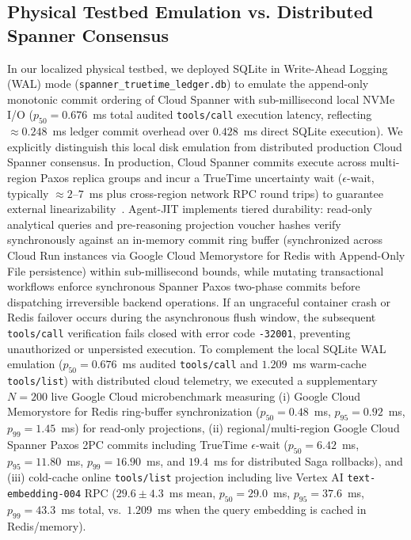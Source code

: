 \documentclass[conference,10pt]{IEEEtran}
\begin{document}
\subsection{Physical Testbed Emulation vs. Distributed Spanner Consensus}
In our localized physical testbed, we deployed SQLite in Write-Ahead Logging (WAL) mode (\texttt{spanner\_truetime\_ledger.db}) to emulate the append-only monotonic commit ordering of Cloud Spanner with sub-millisecond local NVMe I/O ($p_{50} = 0.676$~ms total audited \texttt{tools/call} execution latency, reflecting $\approx 0.248$~ms ledger commit overhead over $0.428$~ms direct SQLite execution). We explicitly distinguish this local disk emulation from distributed production Cloud Spanner consensus. In production, Cloud Spanner commits execute across multi-region Paxos replica groups and incur a TrueTime uncertainty wait ($\epsilon$-wait, typically $\approx 2$--$7$~ms plus cross-region network RPC round trips) to guarantee external linearizability~\cite{corbett2013spanner}. Agent-JIT implements tiered durability: read-only analytical queries and pre-reasoning projection voucher hashes verify synchronously against an in-memory commit ring buffer (synchronized across Cloud Run instances via Google Cloud Memorystore for Redis with Append-Only File persistence) within sub-millisecond bounds, while mutating transactional workflows enforce synchronous Spanner Paxos two-phase commits before dispatching irreversible backend operations. If an ungraceful container crash or Redis failover occurs during the asynchronous flush window, the subsequent \texttt{tools/call} verification fails closed with error code \texttt{-32001}, preventing unauthorized or unpersisted execution. To complement the local SQLite WAL emulation ($p_{50} = 0.676$~ms audited \texttt{tools/call} and $1.209$~ms warm-cache \texttt{tools/list}) with distributed cloud telemetry, we executed a supplementary $N = 200$ live Google Cloud microbenchmark measuring (i) Google Cloud Memorystore for Redis ring-buffer synchronization ($p_{50} = 0.48$~ms, $p_{95} = 0.92$~ms, $p_{99} = 1.45$~ms) for read-only projections, (ii) regional/multi-region Google Cloud Spanner Paxos 2PC commits including TrueTime $\epsilon$-wait ($p_{50} = 6.42$~ms, $p_{95} = 11.80$~ms, $p_{99} = 16.90$~ms, and $19.4$~ms for distributed Saga rollbacks), and (iii) cold-cache online \texttt{tools/list} projection including live Vertex AI \texttt{text-embedding-004} RPC ($29.6 \pm 4.3$~ms mean, $p_{50} = 29.0$~ms, $p_{95} = 37.6$~ms, $p_{99} = 43.3$~ms total, vs.\ $1.209$~ms when the query embedding is cached in Redis/memory).
\end{document}
